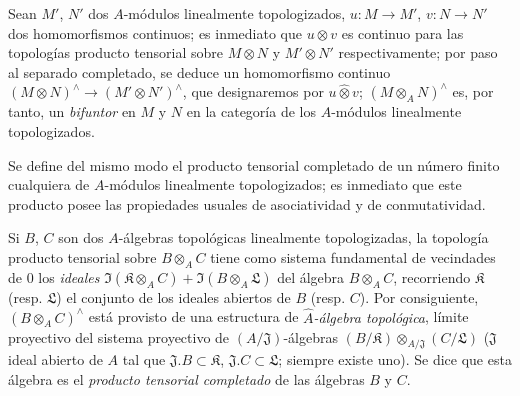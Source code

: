 \begin{env}[7.7.3]
\label{0.7.7.3-fr}
Sean $M'$, $N'$ dos $A$-módulos linealmente topologizados,
$u:M\to M'$, $v:N\to N'$ dos homomorfismos continuos; es inmediato
que $u\otimes v$ es continuo para las topologías producto tensorial sobre
$M\otimes N$ y $M'\otimes N'$ respectivamente; por paso al separado
completado, se deduce un homomorfismo continuo
$(M\otimes N)^\wedge\to(M'\otimes N')^\wedge$, que designaremos
por $u\widehat\otimes v$; $(M\otimes_A N)^\wedge$ es, por tanto, un
\emph{bifuntor} en $M$ y $N$ en la categoría de los $A$-módulos
linealmente topologizados.
\end{env}

\begin{env}[7.7.4]
\label{0.7.7.4-fr}
Se define del mismo modo el producto tensorial completado de un número finito cualquiera
de $A$-módulos linealmente topologizados; es inmediato que este producto
posee las propiedades usuales de asociatividad y de conmutatividad.
\end{env}

\begin{env}[7.7.5]
\label{0.7.7.5-fr}
Si $B$, $C$ son dos $A$-álgebras topológicas linealmente topologizadas,
la topología producto tensorial sobre $B\otimes_A C$ tiene como sistema fundamental
de vecindades de $0$ los \emph{ideales}
$\Im(\mathfrak K\otimes_A C)+\Im(B\otimes_A\mathfrak L)$ del álgebra
$B\otimes_A C$, recorriendo $\mathfrak K$ (resp. $\mathfrak L$) el conjunto
de los ideales abiertos de $B$ (resp. $C$). Por consiguiente, $(B\otimes_A C)^\wedge$
está provisto de una estructura de \emph{$\widehat A$-álgebra topológica}, límite
proyectivo del sistema proyectivo de $(A/\mathfrak J)$-álgebras
$(B/\mathfrak K)\otimes_{A/\mathfrak J}(C/\mathfrak L)$ ($\mathfrak J$
ideal abierto de $A$ tal que $\mathfrak J.B\subset\mathfrak K$,
$\mathfrak J.C\subset\mathfrak L$; siempre existe uno). Se dice que
esta álgebra es el \emph{producto tensorial completado} de las álgebras $B$ y
$C$.
\end{env}

